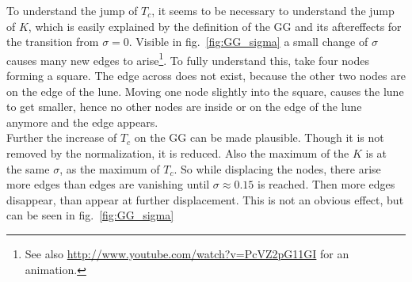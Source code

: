     To understand the jump of \(T_c\), it seems to be necessary to
    understand the jump of \(K\), which is easily explained
    by the definition of the GG and its aftereffects for
    the transition from \(\sigma = 0\). Visible in fig.\ \ref{fig:GG_sigma}
    a small change of \(\sigma\) causes many new edges to arise\footnote{See also \url{http://www.youtube.com/watch?v=PcVZ2pG11GI} for an animation.}.
    To fully understand this, take four nodes forming a square. The edge
    across does not exist, because the other two nodes are on the edge
    of the lune. Moving one node slightly into the square, causes the lune
    to get smaller, hence no other nodes are inside or on the edge of
    the lune anymore and the edge appears.\\
    Further the increase of \(T_c\) on the GG can be made plausible.
    Though it is not removed by the normalization, it is reduced. Also
    the maximum of the \(K\) is at the same \(\sigma\), as the maximum
    of \(T_c\). So while displacing the nodes, there arise more edges
    than edges are vanishing until \(\sigma \approx 0.15\) is reached.
    Then more edges disappear, than appear at further displacement. This
    is not an obvious effect, but can be seen in fig.\ \ref{fig:GG_sigma}
